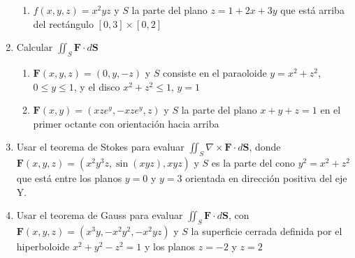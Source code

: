 \documentclass{article}
\begin{document}
\begin{enumerate}
{\begin{enumerate}
{			\color{azul}
           

            }
            
            \item{
            	$f(x,y,z) = x^2yz$ y $S$ la parte del plano $z = 1 + 2x + 3y$ que está arriba del rectángulo $[0,3] \times [0,2]$
           
           \color{azul}
            
            }
            \end{enumerate}

            
	    }

        \item {
           Calcular $\iint_{S} \mathbf{F} \cdot d \mathbf{S}$
            
            \begin{enumerate}
            \item{
				$\mathbf{F} (x,y,z) = (0,y,-z)$ y $S$ consiste en el paraoloide $y = x^2 + z^2$, $0 \leq y \leq 1$, y el disco $x^2 + z^2 \leq 1$, $y = 1$
				
			\color{azul}
           

            }
            
            \item{
            	$\mathbf{F} (x,y) = (xze^y,-xze^y,z)$ y $S$ la parte del plano $x + y+ z = 1$ en el primer octante con orientación hacia arriba
           
           \color{azul}
            
            }
            \end{enumerate} 

            
        }

        \item {
            Usar el teorema de Stokes para evaluar $\iint_{S} \nabla \times \mathbf{F} \cdot d\mathbf{S}$, donde $\mathbf{F}(x,y,z) =(x^2y^3z,\sin(xyz),xyz)$ y $S$ es la parte del cono $y^2 = x^2 + z^2$ que está entre los planos $y = 0$ y $y = 3$ orientada en dirección positiva del eje Y.

            \color{azul}

        }

        \item {
            Usar el teorema de Gauss para evaluar $\iint_{S} \mathbf{F} \cdot d\mathbf{S}$, con $\mathbf{F}(x,y,z) = (x^3y,-x^2y^2,-x^2yz)$ y $S$ la superficie cerrada definida por el hiperboloide $x^2 + y^2 - z^2 = 1$ y los planos $z = -2$ y $z = 2$

}
\end{enumerate}
\end{document}

